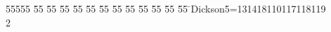 %
%
\begin{tabbing}
55555 \= 55 \= 55 \= 55 \= 55 \= 55 \= 55 \= 55 \= 55 \= 55 \= 55 \= 55 \= 55 \= \>Dickson5=131418110117118119\\[0pt]
2\>\end{tabbing}

